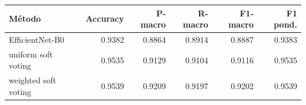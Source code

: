 \begin{tabular}{lrrrrr}
\toprule
\textbf{Método} & \textbf{Accuracy} & \textbf{P-macro} & \textbf{R-macro} & \textbf{F1-macro} & \textbf{F1 pond.} \\
\midrule
EfficientNet-B0 & 0.9382 & 0.8864 & 0.8914 & 0.8887 & 0.9383 \\
uniform soft voting & 0.9535 & 0.9129 & 0.9104 & 0.9116 & 0.9535 \\
weighted soft voting & 0.9539 & 0.9209 & 0.9197 & 0.9202 & 0.9539 \\
\bottomrule
\end{tabular}

